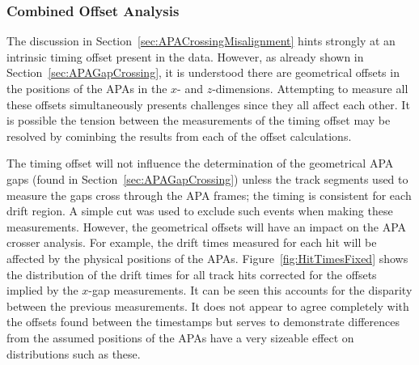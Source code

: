 

\subsubsection{Combined Offset Analysis}\label{sec:CombinedOffsets}

The discussion in Section~\ref{sec:APACrossingMisalignment} hints strongly at an intrinsic timing offset present in the data.  However, as already shown in Section~\ref{sec:APAGapCrossing}, it is understood there are geometrical offsets in the positions of the APAs in the $x$- and $z$-dimensions.  Attempting to measure all these offsets simultaneously presents challenges since they all affect each other.  It is possible the tension between the measurements of the timing offset may be resolved by cominbing the results from each of the offset calculations.

The timing offset will not influence the determination of the geometrical APA gaps (found in Section~\ref{sec:APAGapCrossing}) unless the track segments used to measure the gaps cross through the APA frames; the timing is consistent for each drift region.  A simple cut was used to exclude such events when making these measurements.  However, the geometrical offsets will have an impact on the APA crosser analysis.  For example, the drift times measured for each hit will be affected by the physical positions of the APAs.  Figure~\ref{fig:HitTimesFixed} shows the distribution of the drift times for all track hits corrected for the offsets implied by the $x$-gap measurements.  It can be seen this accounts for the disparity between the previous measurements.  It does not appear to agree completely with the offsets found between the timestamps but serves to demonstrate differences from the assumed positions of the APAs have a very sizeable effect on distributions such as these.

